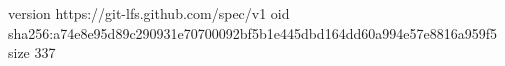 version https://git-lfs.github.com/spec/v1
oid sha256:a74e8e95d89c290931e70700092bf5b1e445dbd164dd60a994e57e8816a959f5
size 337
